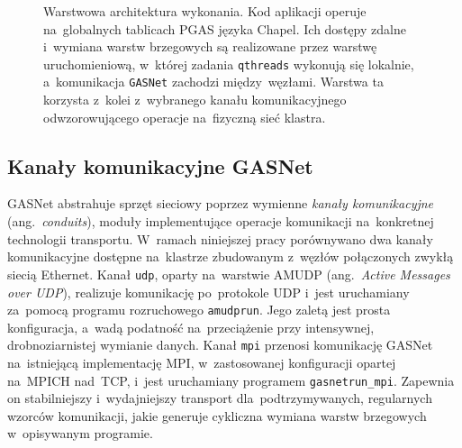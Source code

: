 \begin{figure}[htbp]
  \centering
  \caption[Warstwy stosu Chapel/PGAS/GASNet]{Warstwowa architektura wykonania.
  Kod aplikacji operuje na~globalnych tablicach PGAS języka Chapel. Ich dostępy
  zdalne i~wymiana warstw brzegowych są realizowane przez warstwę uruchomieniową,
  w~której zadania \texttt{qthreads} wykonują się lokalnie, a~komunikacja \texttt{GASNet}
  zachodzi między~węzłami. Warstwa ta korzysta z~kolei z~wybranego kanału komunikacyjnego
  odwzorowującego operacje na~fizyczną sieć klastra.}
  \label{fig:layers}
\end{figure}

\subsection{Kanały komunikacyjne GASNet}

GASNet abstrahuje sprzęt sieciowy poprzez wymienne \emph{kanały komunikacyjne}
(ang.\ \emph{conduits}), moduły implementujące operacje komunikacji
na~konkretnej technologii transportu. W~ramach niniejszej pracy porównywano dwa
kanały komunikacyjne dostępne na~klastrze zbudowanym z~węzłów połączonych zwykłą siecią
Ethernet. Kanał \texttt{udp}, oparty na~warstwie AMUDP (ang.~\emph{Active Messages over UDP}),
realizuje komunikację po~protokole UDP i~jest uruchamiany za~pomocą programu
rozruchowego \texttt{amudprun}. Jego zaletą jest prosta konfiguracja, a~wadą
podatność na~przeciążenie przy intensywnej, drobnoziarnistej wymianie danych.
Kanał \texttt{mpi} przenosi komunikację GASNet na~istniejącą implementację
MPI, w~zastosowanej konfiguracji opartej na~MPICH nad~TCP, i~jest uruchamiany
programem \texttt{gasnetrun\_mpi}. Zapewnia on stabilniejszy i~wydajniejszy
transport dla~podtrzymywanych, regularnych wzorców komunikacji, jakie generuje
cykliczna wymiana warstw brzegowych w~opisywanym programie.

